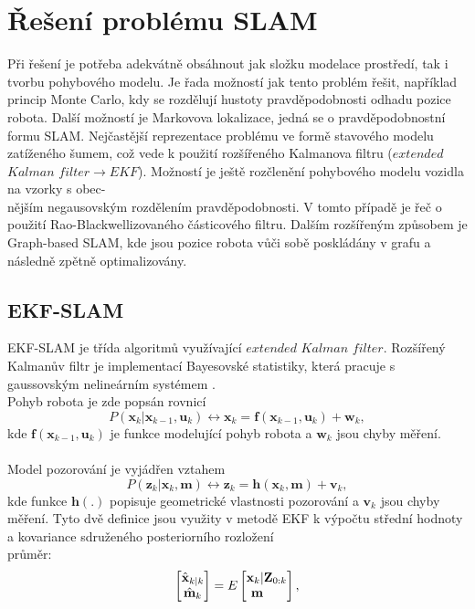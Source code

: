 \documentclass[12pt]{report}
\begin{document}
\newpage
\section{Řešení problému SLAM}
Při řešení je potřeba adekvátně obsáhnout jak složku modelace prostředí, tak i tvorbu pohybového modelu.
Je řada možností jak tento problém řešit, například princip Monte Carlo, kdy se rozdělují hustoty pravděpodobnosti odhadu pozice robota. Další možností je Markovova lokalizace, jedná se o pravděpodobnostní formu SLAM. Nejčastější reprezentace problému ve formě stavového modelu zatíženého šumem, což vede k použití rozšířeného Kalmanova filtru ($extended$ $Kalman$ $filter\rightarrow EKF$). Možností je ještě rozčlenění pohybového modelu vozidla na vzorky s obec-\\nějším negausovským rozdělením pravděpodobnosti. V tomto případě je řeč o použití Rao-Blackwellizovaného částicového filtru. Dalším rozšířeným způsobem je Graph-based SLAM, kde jsou pozice robota vůči sobě poskládány v grafu a následně zpětně optimalizovány. 
\\
\subsection{EKF-SLAM}
EKF-SLAM je třída algoritmů využívající $extended$ $Kalman$ $filter$. Rozšířený Kalmanův filtr je implementací Bayesovské statistiky, která pracuje s gaussovským nelineárním systémem \cite{Durrant-Whyte2006}. \\
Pohyb robota je zde popsán rovnicí
\begin{equation}
	P(\textbf{x}_k|\textbf{x}_{k-1},\textbf{u}_k)\leftrightarrow \textbf{x}_k=\textbf{f}(\textbf{x}_{k-1},\textbf{u}_k)+\textbf{w}_k,
\end{equation} 
kde $\textbf{f}(\textbf{x}_{k-1},\textbf{u}_k)$ je funkce modelující pohyb robota a $\textbf{w}_k$ jsou chyby měření.\\
\\
Model pozorování je vyjádřen vztahem
\begin{equation}
	P(\textbf{z}_k|\textbf{x}_k,\textbf{m})\leftrightarrow \textbf{z}_k=\textbf{h}(\textbf{x}_k,\textbf{m})+\textbf{v}_k,
\end{equation}
kde funkce $\textbf{h}(.)$ popisuje geometrické vlastnosti pozorování a $\textbf{v}_k$ jsou chyby měření.
Tyto dvě definice jsou využity v metodě EKF k výpočtu střední hodnoty a kovariance sdruženého posteriorního rozložení\\
\indent průměr:
\begin{equation}
	\begin{bmatrix}
	\hat{\textbf{x}}_{k|k}\\\hat{\textbf{m}}_k
	\end{bmatrix}=E
	\begin{bmatrix}
	\textbf{x}_k |\textbf{Z}_{0:k}\\\textbf{m}\indent
	\end{bmatrix},
\end{equation}
\end{document}

